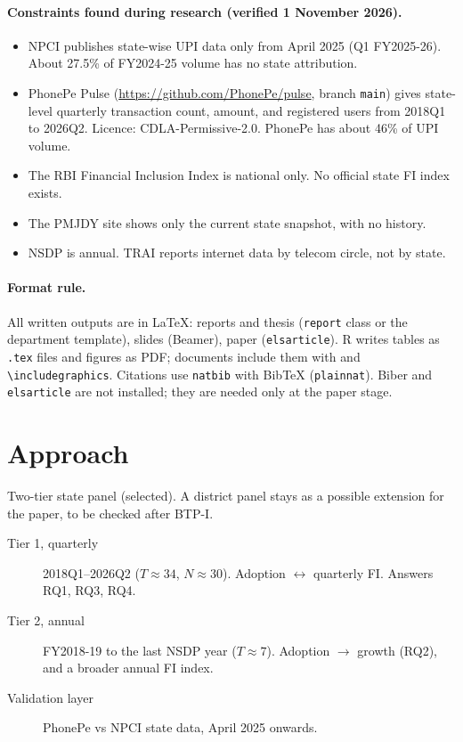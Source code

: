 \documentclass[11pt,a4paper]{article}
\begin{document}
\paragraph{Constraints found during research (verified 1 November 2026).}
\begin{itemize}
  \item NPCI publishes state-wise UPI data only from April 2025 (Q1 FY2025-26).
        About 27.5\% of FY2024-25 volume has no state attribution.
  \item PhonePe Pulse (\url{https://github.com/PhonePe/pulse}, branch \texttt{main}) gives state-level
        quarterly transaction count, amount, and registered users from 2018Q1 to 2026Q2.
        Licence: CDLA-Permissive-2.0. PhonePe has about 46\% of UPI volume.
  \item The RBI Financial Inclusion Index is national only. No official state FI index exists.
  \item The PMJDY site shows only the current state snapshot, with no history.
  \item NSDP is annual. TRAI reports internet data by telecom circle, not by state.
\end{itemize}

\paragraph{Format rule.} All written outputs are in \LaTeX: reports and thesis (\texttt{report} class or the
department template), slides (Beamer), paper (\texttt{elsarticle}). R writes tables as \texttt{.tex}
files and figures as PDF; documents include them with \verb|| and \verb|\includegraphics|.
Citations use \texttt{natbib} with BibTeX (\texttt{plainnat}). Biber and \texttt{elsarticle} are not
installed; they are needed only at the paper stage.

\section{Approach}

Two-tier state panel (selected). A district panel stays as a possible extension for the paper, to be
checked after BTP-I.

\begin{description}
  \item[Tier 1, quarterly] 2018Q1--2026Q2 ($T \approx 34$, $N \approx 30$). Adoption $\leftrightarrow$
        quarterly FI. Answers RQ1, RQ3, RQ4.
  \item[Tier 2, annual] FY2018-19 to the last NSDP year ($T \approx 7$). Adoption $\to$ growth (RQ2),
        and a broader annual FI index.
  \item[Validation layer] PhonePe vs NPCI state data, April 2025 onwards.
\end{description}
\end{document}
